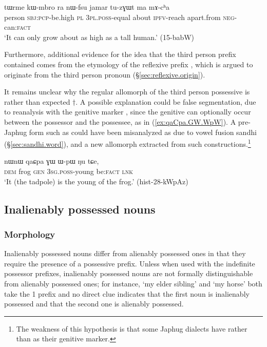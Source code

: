 \begin{exe}
\ex \label{ex:nWfsu}
\gll tɯrme kɯ-mbro ra nɯ-fsu jamar tu-zɣɯt ma mɤ-cʰa \\
person \textsc{sbj}:\textsc{pcp}-be.high \textsc{pl}  \textsc{3pl}.\textsc{poss}-equal about \textsc{ipfv}-reach apart.from \textsc{neg}-can:\textsc{fact} \\
\glt `It can only grow about as high as a tall human.' (15-babW)
\end{exe}

Furthermore, additional evidence for the idea that the third person prefix contained  comes from the etymology of the reflexive prefix , which is argued to originate from the third person pronoun (§\ref{sec:reflexive.origin}).

It remains unclear why the regular allomorph of the third person possessive is  rather than expected $\dagger$. A possible explanation could be false segmentation, due to reanalysis with the genitive marker , since the genitive can optionally occur between the possessor and the possessee, as in (\ref{ex:qaCpa.GW.WpW}). A pre-Japhug form such as  could have been misanalyzed as  due to vowel fusion sandhi (§\ref{sec:sandhi.word}), and a new allomorph  extracted from such constructions.\footnote{The weakness of this hypothesis is that some Japhug dialects have  rather than  as their genitive marker.}

\begin{exe}
\ex \label{ex:qaCpa.GW.WpW}
 \gll nɯnɯ qaɕpa ɣɯ ɯ-pɯ ŋu tɕe, \\
 \textsc{dem} frog \textsc{gen} \textsc{3sg}.\textsc{poss}-young be:\textsc{fact} \textsc{lnk} \\
 \glt `It (the tadpole) is the young of the frog.' (hist-28-kWpAz)
\end{exe} 


\subsection{Inalienably possessed nouns} \label{sec:inalienably.possessed}

\subsubsection{Morphology} \label{sec:inalienably.possessed.morpho}
Inalienably possessed nouns differ from alienably possessed ones in that they require the presence of a possessive prefix.  Unless when used with the indefinite possessor prefixes, inalienably possessed nouns are not formally distinguishable from alienably possessed ones; for instance,  `my elder sibling' and  `my horse' both take the 1\sg{}  prefix and no direct clue indicates that the first noun is inalienably possessed and that the second one is alienably possessed.


